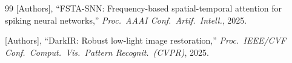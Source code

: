 \documentclass[conference]{IEEEtran}
\begin{document}
\begin{thebibliography}{99}
[Authors],
``FSTA-SNN: Frequency-based spatial-temporal attention for spiking
neural networks,''
\emph{Proc.\ AAAI Conf.\ Artif.\ Intell.}, 2025.

[Authors],
``DarkIR: Robust low-light image restoration,''
\emph{Proc.\ IEEE/CVF Conf.\ Comput.\ Vis.\ Pattern Recognit.\
(CVPR)}, 2025.

\end{thebibliography}
\end{document}
